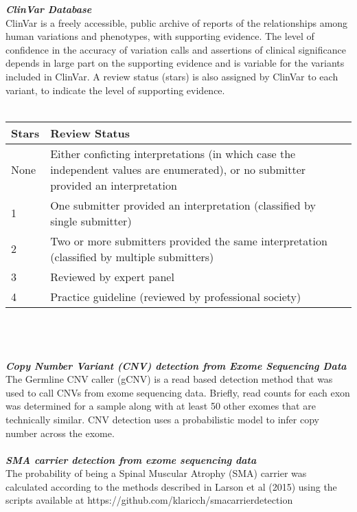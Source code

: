 \newpage
{\large \textbf{\textit{ClinVar Database}}}
\\
ClinVar is a freely accessible, public archive of reports of the relationships among human variations and phenotypes, with supporting evidence. The level of confidence in the accuracy of variation calls and assertions of clinical significance depends in large part on the supporting evidence and is variable for the variants included in ClinVar. A review status (stars) is also assigned by ClinVar to each variant, to indicate the level of supporting evidence. 
\\ \\

\begin{small}
\begin{tabular}{ |p{1cm}|p{15cm}|  }
\hline
\textbf{Stars} & \textbf{Review Status} \\
\hline
None & Either conficting interpretations (in which case the independent values are enumerated), or no submitter provided an interpretation \\
1 & One submitter provided an interpretation (classified by single submitter) \\
2 & Two or more submitters provided the same interpretation (classified by multiple submitters) \\
3 & Reviewed by expert panel \\
4 & Practice guideline (reviewed by professional society) \\
\hline
\end{tabular}
\end{small}
\\ \\ \\

{\large \textbf{\textit{Copy Number Variant (CNV) detection from Exome Sequencing Data}}}
\\
The Germline CNV caller (gCNV) is a read based detection method that was used to call CNVs from exome sequencing data. Briefly, read counts for each exon was determined for a sample along with at least 50 other exomes that are technically similar. CNV detection uses a probabilistic model to infer copy number across the exome.
\\ \\ 

{\large \textbf{\textit{SMA carrier detection from exome sequencing data}}}
\\
The probability of being a Spinal Muscular Atrophy (SMA) carrier was calculated according to the methods
described in Larson et al (2015) using the scripts available at https://github.com/klaricch/sma{\textunderscore}carrier{\textunderscore}detection \\ 
\\ \\ 

